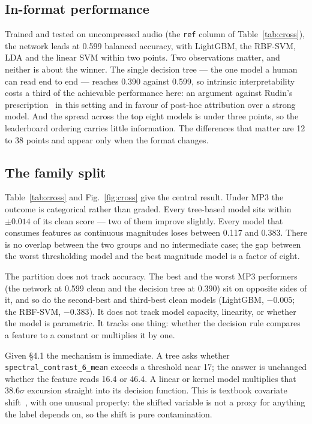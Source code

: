 \documentclass[a4paper,9pt,twocolumn]{extarticle}
\newcommand{\ft}[1]{\texttt{\footnotesize #1}}
\newcommand{\scsix}{\ft{spectral\_contrast\_6\_mean}}
\begin{document}
\subsection{In-format performance}\label{sec:leaderboard}
Trained and tested on uncompressed audio (the \ft{ref} column of
Table~\ref{tab:cross}), the network leads at 0.599 balanced accuracy, with
LightGBM, the RBF-SVM, LDA and the linear SVM within two points. Two
observations matter, and neither is about the winner. The single decision tree
--- the one model a human can read end to end --- reaches 0.390 against 0.599,
so intrinsic interpretability costs a third of the achievable performance here:
an argument against Rudin's prescription~\cite{rudin2019stop} in this setting
and in favour of post-hoc attribution over a strong model. And the spread
across the top eight models is under three points, so the leaderboard ordering
carries little information. The differences that matter are 12 to 38 points and
appear only when the format changes.

\subsection{The family split}\label{sec:family}
Table~\ref{tab:cross} and Fig.~\ref{fig:cross} give the central result. Under
MP3 the outcome is categorical rather than graded. Every tree-based model sits
within $\pm0.014$ of its clean score --- two of them improve slightly. Every
model that consumes features as continuous magnitudes loses between 0.117 and
0.383. There is no overlap between the two groups and no intermediate case; the
gap between the worst thresholding model and the best magnitude model is a
factor of eight.

The partition does not track accuracy. The best and the worst MP3 performers
(the network at 0.599 clean and the decision tree at 0.390) sit on opposite
sides of it, and so do the second-best and third-best clean models (LightGBM,
$-0.005$; the RBF-SVM, $-0.383$). It does not track model capacity, linearity,
or whether the model is parametric. It tracks one thing: whether the decision
rule compares a feature to a constant or multiplies it by one.

Given \S4.1 the mechanism is immediate. A tree asks whether \scsix{} exceeds a
threshold near 17; the answer is unchanged whether the feature reads 16.4 or
46.4. A linear or kernel model multiplies that 38.6$\sigma$ excursion straight
into its decision function. This is textbook covariate
shift~\cite{morenotorres2012shift}, with one unusual property: the shifted
variable is not a proxy for anything the label depends on, so the shift is pure
contamination.
\end{document}
